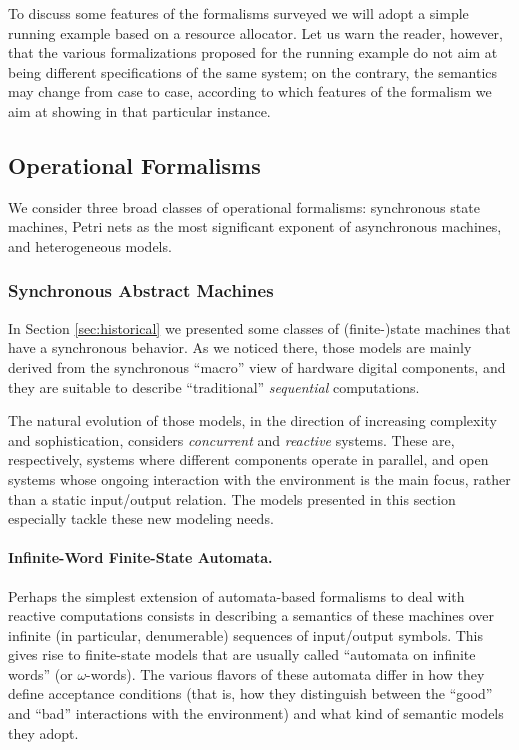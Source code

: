 To discuss some features of the formalisms surveyed we will 
adopt a simple running example based on a resource allocator. 
Let us warn the reader, however, that the various formalizations 
proposed for the running example do not aim at being different 
specifications of the same system; on the contrary, the semantics 
may change from case to case, according to which features of 
the formalism we aim at showing in that particular instance.



\subsection{Operational Formalisms} \label{sec:operational}
We consider three broad classes of operational formalisms: synchronous 
state machines, Petri nets as the most significant exponent of 
asynchronous machines, and heterogeneous models.


\subsubsection{Synchronous Abstract Machines} \label{sec:synchronous}
In Section \ref{sec:historical} we presented some classes of (finite-)state 
machines that have a synchronous behavior. As we noticed there, 
those models are mainly derived from the synchronous ``macro'' 
view of hardware digital components, and they are suitable to 
describe ``traditional'' \emph{sequential} computations.

The natural evolution of those models, in the direction of increasing
complexity and sophistication, considers \emph{concurrent} and
\emph{reactive} systems. These are, respectively, systems where
different components operate in parallel, and open systems whose
ongoing interaction with the environment is the main focus, rather
than a static input/output relation. The models presented in this
section especially tackle these new modeling needs.


\paragraph{Infinite-Word Finite-State Automata.}
Perhaps the simplest extension of automata-based formalisms to 
deal with reactive computations consists in describing a semantics 
of these machines over infinite (in particular, denumerable) 
sequences of input/output symbols. This gives rise to finite-state 
models that are usually called ``automata on infinite words'' (or $\omega$-words).
The various flavors of these automata differ in how they define 
acceptance conditions (that is, how they distinguish between 
the ``good'' and ``bad'' interactions with the environment) and 
what kind of semantic models they adopt.


